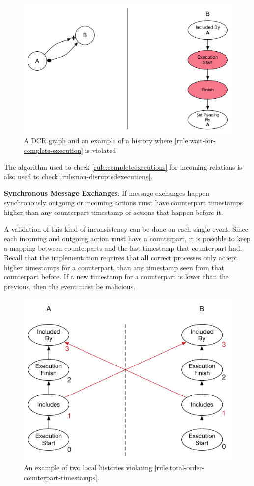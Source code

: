 	\begin{figure}[H]
		\centering
		\includegraphics[width=.7\textwidth]{5validation/images/wait-for-complete-execution.pdf}
		\caption{A DCR graph and an example of a history where \autoref{rule:wait-for-complete-execution} is violated}
		\label{fig:validation:wait-for-complete-execution}
	\end{figure}
	
	\noindent The algorithm used to check \autoref{rule:completeexecutions} for incoming relations is also used to check \autoref{rule:non-disruptedexecutions}.
		
	\begin{ruledef}
		\textbf{Synchronous Message Exchanges}: If message exchanges happen synchronously outgoing or incoming actions must have counterpart timestamps higher than any counterpart timestamp of actions that happen before it.
		\label{rule:total-order-counterpart-timestamps}
	\end{ruledef}
	
	\noindent A validation of this kind of inconsistency can be done on each single event. Since each incoming and outgoing action must have a counterpart, it is possible to keep a mapping between counterparts and the last timestamp that counterpart had. Recall that the implementation requires that all correct processes only accept higher timestamps for a counterpart, than any timestamp seen from that counterpart before.  If a new timestamp for a counterpart is lower than the previous, then the event must be malicious.
	
	\begin{figure}[H]
		\centering
		\includegraphics[width=.5\textwidth]{5validation/images/total-order-of-counterpart-timestamps-cycle.pdf}
		\caption{An example of two local histories violating \autoref{rule:total-order-counterpart-timestamps}.}
		\label{fig:validation:total-order-of-counterpart-timestamps}
	\end{figure}
	
